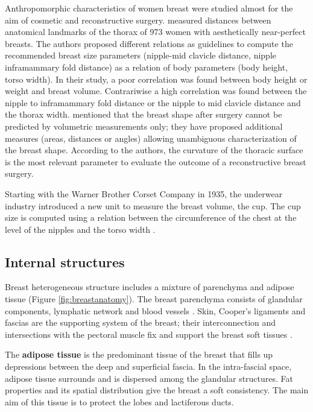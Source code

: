 Anthropomorphic characteristics of women breast were studied almost for the aim of cosmetic and reconstructive surgery.  \cite{vandeput2002considerations} measured distances between anatomical landmarks of the thorax of 973 women with aesthetically near-perfect breasts. The authors proposed different relations as guidelines to compute the recommended breast size parameters (nipple-mid clavicle distance, nipple inframammary fold distance) as a relation of body parameters (body height, torso width). In their study, a poor correlation was found between body height or weight and breast volume. Contrariwise a high correlation was found between the nipple to  inframammary fold distance or the nipple to mid clavicle distance and the thorax width. \cite{catanuto2008experimental} mentioned that the breast shape after surgery cannot be predicted by volumetric measurements only; they have proposed additional measures (areas, distances or angles) allowing unambiguous characterization of the breast shape. According to the authors, the curvature of the thoracic surface is the most relevant parameter to evaluate the outcome of a reconstructive breast surgery.
 
Starting with the Warner Brother Corset Company in 1935, the underwear industry introduced a new unit to measure the breast volume, the cup. The cup size is computed using a relation between the circumference of the chest at the level of the nipples and the torso width \citep{pechter_new_1998}.

\subsection{Internal structures}\label{subsection:internalstructures}

Breast heterogeneous structure includes a mixture of parenchyma and adipose tissue (Figure \ref{fig:breastanatomy}). The breast parenchyma consists of glandular components, lymphatic network and blood vessels \citep{clemente2011anatomy}. Skin, Cooper's ligaments and fascias are the supporting system of the breast; their interconnection and intersections with the pectoral muscle fix and support the breast soft tissues \citep{mugea2014aesthetic}.

The \textbf{ adipose tissue} is the predominant tissue of the breast that fills up depressions between the deep and superficial fascia. In the intra-fascial space, adipose tissue surrounds and is dispersed among the glandular structures. Fat properties and its spatial distribution give the breast a soft consistency. The main aim of this tissue is to protect the lobes and lactiferous ducts.

